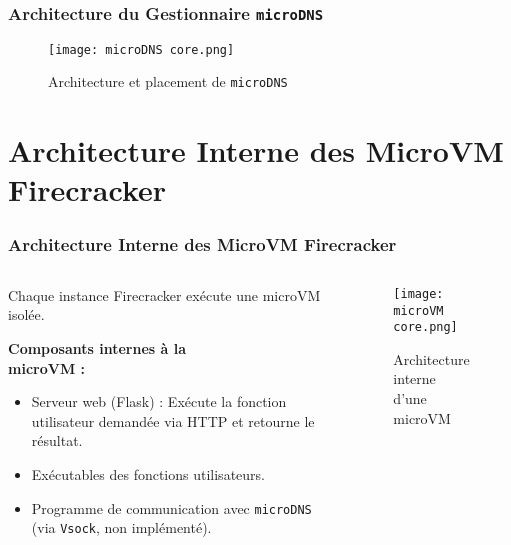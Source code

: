 \documentclass[12pt]{beamer}
\begin{document}
	\begin{frame}
		\frametitle{Architecture du Gestionnaire \texttt{microDNS}}
				\begin{figure}
					\centering
					\texttt{[image: microDNS core.png]}
					\caption{Architecture et placement de \texttt{microDNS}}
				\end{figure}
	\end{frame}

    \section{Architecture Interne des MicroVM Firecracker}
	\begin{frame}
		\frametitle{Architecture Interne des MicroVM Firecracker}
		\begin{columns}[T]
			\begin{column}{0.5\textwidth}
				\RaggedRight
				Chaque instance Firecracker exécute une microVM isolée.

				\textbf{Composants internes à la \\ microVM :}
				\begin{itemize}
					\item Serveur web (Flask) : Exécute la fonction utilisateur demandée via HTTP et retourne le résultat.
					\item Exécutables des fonctions utilisateurs.
					\item Programme de communication avec \texttt{microDNS} (via \texttt{Vsock}, non implémenté).
				\end{itemize}
			\end{column}
			\begin{column}{0.48\textwidth}
				\begin{figure}
					\texttt{[image: microVM core.png]}
					\caption{Architecture interne d'une microVM}
				\end{figure}
			\end{column}
		\end{columns}
	\end{frame}
\end{document}
